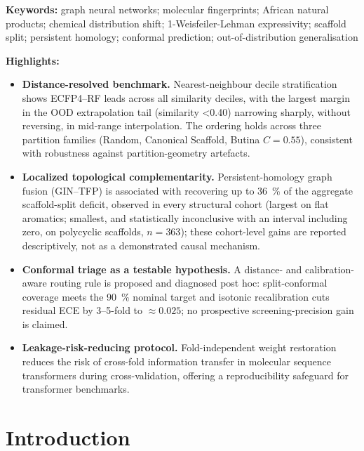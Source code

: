 \documentclass[11pt,a4paper]{article}
\begin{document}
\noindent\textbf{Keywords:} graph neural networks; molecular fingerprints; African natural products; chemical distribution shift; 1-Weisfeiler-Lehman expressivity; scaffold split; persistent homology; conformal prediction; out-of-distribution generalisation

\noindent\textbf{Highlights:}
\begin{itemize}
\item \textbf{Distance-resolved benchmark.} Nearest-neighbour decile stratification shows ECFP4--RF leads across all similarity deciles, with the largest margin in the OOD extrapolation tail (similarity \num{<0.40}) narrowing sharply, without reversing, in mid-range interpolation. The ordering holds across three partition families (Random, Canonical Scaffold, Butina $C=\num{0.55}$), consistent with robustness against partition-geometry artefacts.
\item \textbf{Localized topological complementarity.} Persistent-homology graph fusion (GIN--TFP) is associated with recovering up to \qty{36}{\percent} of the aggregate scaffold-split deficit, observed in every structural cohort (largest on flat aromatics; smallest, and statistically inconclusive with an interval including zero, on polycyclic scaffolds, $n=\num{363}$); these cohort-level gains are reported descriptively, not as a demonstrated causal mechanism.
\item \textbf{Conformal triage as a testable hypothesis.} A distance- and calibration-aware routing rule is proposed and diagnosed post hoc: split-conformal coverage meets the \qty{90}{\percent} nominal target and isotonic recalibration cuts residual ECE by \numrange{3}{5}-fold to $\approx\num{0.025}$; no prospective screening-precision gain is claimed.
\item \textbf{Leakage-risk-reducing protocol.} Fold-independent weight restoration reduces the risk of cross-fold information transfer in molecular sequence transformers during cross-validation, offering a reproducibility safeguard for transformer benchmarks.
\end{itemize}


\section{Introduction}
\end{document}
